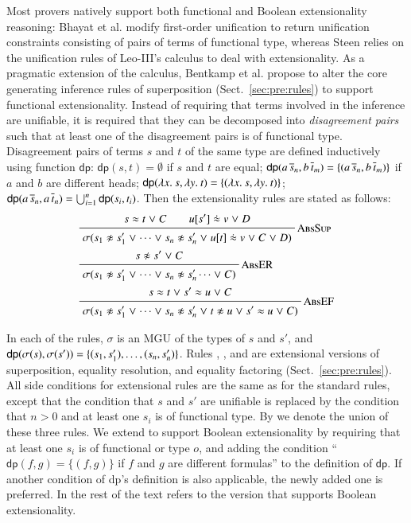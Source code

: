 Most provers natively support both functional and Boolean extensionality
reasoning: Bhayat et al. \cite{br-20-full-sup-w-combs} modify first-order
unification to return unification constraints consisting of pairs of terms of
functional type, whereas Steen relies on the unification rules of Leo-III's
calculus \cite[Section 4.3.3]{as-18-phd} to deal with extensionality. As a
pragmatic extension of the \lsup{} calculus, Bentkamp et al.
\cite{bbtvw-21-sup-lam} propose to alter the core generating inference rules of
superposition (Sect.~\ref{sec:pre:rules}) to support functional extensionality.
Instead of requiring that terms involved in the inference are unifiable, it is
required that they can be decomposed into \emph{disagreement pairs} such that at
least one of the disagreement pairs is of functional type. Disagreement pairs of
terms $s$ and $t$ of the same type are defined inductively using function
$\textsf{dp}$: $\textsf{dp}(s,t) = \emptyset$ if $s$ and $t$ are equal;
$\textsf{dp}(a \, \overline{s}_{n}, b \, \overline{t}_{m}) = \{(a \, \overline{s}_{n}, b \,
\overline{t}_{m})\}$ if $a$ and $b$ are different heads; $\textsf{dp}(\lambda x.\> s,
\lambda y.\> t) = \{ (\lambda x.\> s, \lambda y.\> t) \}$; $\textsf{dp}(a \, \overline{s}_{n}, a
\, \overline{t}_{n}) = \bigcup_{i=1}^{n} \textsf{dp}(s_i, t_i)$. Then the
extensionality rules are stated as follows:
\pagebreak[2]
\begin{align*}
  & \namedinference{AbsSup}
  {s \eq t \llor C \qquad u[s'] \mathrel{\dot{\eq}} v \llor D}
  {\sigmacl{s_1 \noteq s'_1 \llor \cdots \llor s_n \noteq s'_n \llor  u[t] \mathrel{\dot{\eq}} v \llor C \llor D}} \\
  &\namedinference{AbsER}{s \noteq s' \llor C}{\sigmacl{s_1 \noteq s'_1 \llor \cdots \llor s_n \noteq s'_n \cdots \llor  C}} \\
  &\namedinference{AbsEF}{s \eq t \llor  s' \eq u \llor C}{\sigmacl{s_1 \noteq s'_1 \llor \cdots \llor s_n \noteq s'_n \llor t \noteq u \llor  s' \eq u \llor C}}
\end{align*}

\noindent{}
In each of the rules, $\sigma$ is an MGU of the types of $s$ and
$s'$, and $\textsf{dp}(\sigma(s) ,\sigma(s')) = \{ (s_1, s'_1), \ldots,\allowbreak
(s_n, s'_n)\}$. Rules , , and  are
extensional versions of superposition, equality resolution, and equality
factoring (Sect.~\ref{sec:pre:rules}). All side conditions for extensional rules are the same as for
the standard rules, except that the condition that $s$ and $s'$ are unifiable is
replaced by the condition that $n>0$ and at least one $s_i$ is of functional type. By  we denote the union of
these three rules. We extend  to support Boolean extensionality by
requiring that at least one $s_i$ is of functional or type $o$, and adding the
condition ``$\textsf{dp}(f, g) = \{(f,g)\}$ if $f$ and $g$ are different
formulas'' to the definition of $\textsf{dp}$. If another condition of \textsf{dp}'s 
definition is also applicable, the newly added one is preferred. In the rest of the
text  refers to the version that supports Boolean extensionality.


